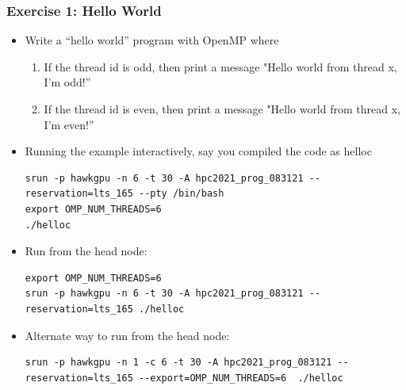 \documentclass[10pt,t]{beamer}
\begin{document}
\begin{frame}[fragile]
  \frametitle{Exercise 1: Hello World}
  \begin{itemize}
    \item Write a ``hello world'' program with OpenMP where
      \begin{enumerate}
        \item If the thread id is odd, then print a message "Hello world from thread x, I'm odd!''
        \item If the thread id is even, then print a message "Hello world from thread x, I'm even!''
      \end{enumerate}
    \item Running the example interactively, say you compiled the code as helloc
	  \begin{lstlisting}[basicstyle=\footnotesize\ttfamily]
srun -p hawkgpu -n 6 -t 30 -A hpc2021_prog_083121 --reservation=lts_165 --pty /bin/bash
export OMP_NUM_THREADS=6
./helloc
           \end{lstlisting}
     \item Run from the head node: 
       \begin{lstlisting}[basicstyle=\footnotesize\ttfamily]
export OMP_NUM_THREADS=6
srun -p hawkgpu -n 6 -t 30 -A hpc2021_prog_083121 --reservation=lts_165 ./helloc
       \end{lstlisting}
     \item Alternate way to run from the head node: 
       \begin{lstlisting}[basicstyle=\footnotesize\ttfamily]
srun -p hawkgpu -n 1 -c 6 -t 30 -A hpc2021_prog_083121 --reservation=lts_165 --export=OMP_NUM_THREADS=6  ./helloc
       \end{lstlisting}
  \end{itemize}
%      
%      
\end{frame}
\end{document}
